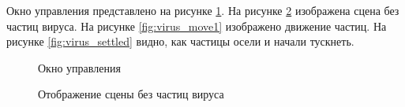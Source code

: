 Окно управления представлено на рисунке \ref{fig:menu}. На рисунке \ref{fig:simple} изображена сцена без частиц вируса. На рисунке \ref{fig:virus_move1} изображено движение частиц. На рисунке \ref{fig:virus_settled} видно, как частицы осели и начали тускнеть.

\begin{figure}[ph!]
	\caption{Окно управления}
	\label{fig:menu}
\end{figure}

\begin{figure}[ph!]
	\caption{Отображение сцены без частиц вируса}
	\label{fig:simple}
\end{figure}

